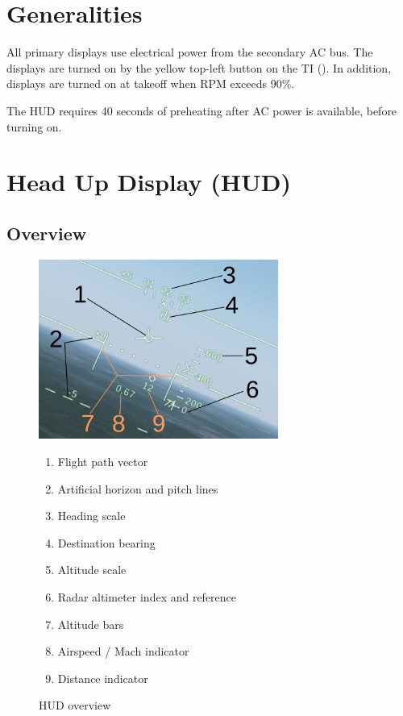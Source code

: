 \section{Generalities}
All primary displays use electrical power from the secondary AC bus.
The displays are turned on by the yellow top-left button on the TI
().
In addition, displays are turned on at takeoff when RPM exceeds 90\%.

The HUD requires 40 seconds of preheating after AC power is available, before turning on.

\section{Head Up Display (HUD)}
\subsection{Overview}
\begin{figure}[!ht]
  \centering
  \includegraphics[width=0.7\textwidth]{images/displays/ja-hud-general.png}

  \begin{multicols}{2}
    \begin{enumerate}[nosep]
      \item \label{item:fpv} Flight path vector
      \item \label{item:horizon} Artificial horizon and pitch lines
      \item \label{item:heading} Heading scale
      \item \label{item:dest} Destination bearing
      \item \label{item:altitude} Altitude scale
      \item \label{item:rhm} Radar altimeter index and reference
      \item \label{item:altbars} Altitude bars
      \item \label{item:speed} Airspeed / Mach indicator
      \item \label{item:distance} Distance indicator
    \end{enumerate}
  \end{multicols}

  \caption{HUD overview}
  \label{fig:hud}
\end{figure}

